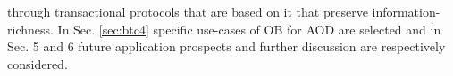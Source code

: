 \documentclass[final,5p,times,twocolumn,authoryear]{elsarticle}
\begin{document}
through transactional protocols that are based on it that preserve information-richness.  In Sec. \ref{sec:btc4} specific use-cases of OB for AOD are selected and in Sec. 5 and 6 future application prospects and further discussion are respectively considered.



\end{document}
